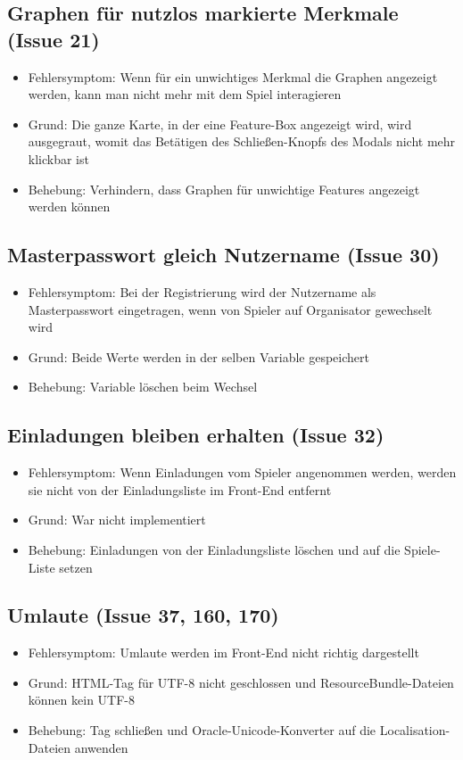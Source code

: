 \documentclass[a4paper]{scrreprt}
\begin{document}
    \subsection{Graphen für nutzlos markierte Merkmale (Issue 21)}
    \begin{itemize}
        \item Fehlersymptom: Wenn für ein unwichtiges Merkmal die Graphen angezeigt werden, kann man nicht mehr mit dem Spiel interagieren
        \item Grund: Die ganze Karte, in der eine Feature-Box angezeigt wird, wird ausgegraut, womit das Betätigen des Schließen-Knopfs des Modals nicht mehr klickbar ist
        \item Behebung: Verhindern, dass Graphen für unwichtige Features angezeigt werden können
    \end{itemize}

    \subsection{Masterpasswort gleich Nutzername (Issue 30)}
    \begin{itemize}
        \item Fehlersymptom: Bei der Registrierung wird der Nutzername als Masterpasswort eingetragen, wenn von Spieler auf Organisator gewechselt wird
        \item Grund: Beide Werte werden in der selben Variable gespeichert
        \item Behebung: Variable löschen beim Wechsel
    \end{itemize}

    \subsection{Einladungen bleiben erhalten (Issue 32)}
    \begin{itemize}
        \item Fehlersymptom: Wenn Einladungen vom Spieler angenommen werden, werden sie nicht von der Einladungsliste im Front-End entfernt
        \item Grund: War nicht implementiert
        \item Behebung: Einladungen von der Einladungsliste löschen und auf die Spiele-Liste setzen
    \end{itemize}

    \subsection{Umlaute (Issue 37, 160, 170)}
    \begin{itemize}
        \item Fehlersymptom: Umlaute werden im Front-End nicht richtig dargestellt
        \item Grund: HTML-Tag für UTF-8 nicht geschlossen und ResourceBundle-Dateien können kein UTF-8
        \item Behebung: Tag schließen und Oracle-Unicode-Konverter auf die Localisation-Dateien anwenden
    \end{itemize}
\end{document}
